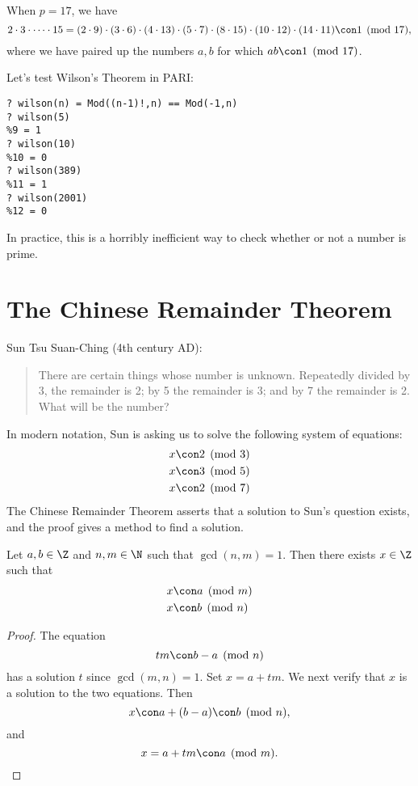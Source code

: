 \documentclass[11pt]{report}
\begin{document}
\begin{example}
  When $p=17$, we have
  $$
    2\cdot 3\cdot \cdots \cdot 15
    = (2\cdot 9)\cdot(3\cdot 6)\cdot(4\cdot 13)\cdot
    (5\cdot 7)\cdot(8\cdot 15)\cdot(10\cdot 12)\cdot(14\cdot 11)
    \con 1\pmod{17},$$
  where we have paired up the numbers $a, b$ for
  which $ab\con 1\pmod{17}$.
\end{example}

Let's test Wilson's Theorem in PARI:
\begin{verbatim}
? wilson(n) = Mod((n-1)!,n) == Mod(-1,n)   
? wilson(5)
%9 = 1
? wilson(10)
%10 = 0
? wilson(389)
%11 = 1
? wilson(2001)
%12 = 0
\end{verbatim}

 In practice, this is a horribly inefficient way to check
whether or not a number is prime.

\section{The Chinese Remainder Theorem}
Sun Tsu Suan-Ching (4th century AD):
\begin{quote}
  There are certain things whose number is unknown. Repeatedly divided
  by 3, the remainder is 2; by 5 the remainder is 3; and by 7 the
  remainder is 2. What will be the number?
\end{quote}
In modern notation, Sun is asking us to solve the following system of
equations:
\begin{align*}
  x & \con 2 \pmod{3} \\
  x & \con 3 \pmod{5} \\
  x & \con 2 \pmod{7}
\end{align*}
The Chinese Remainder Theorem asserts that a solution to Sun's
question exists, and the proof gives a method to find a solution.

\begin{theorem}
  Let $a, b\in\Z$ and $n,m\in\N$ such that
  $\gcd(n,m)=1$.  Then there exists $x\in\Z$ such that
  \begin{align*}
    x & \con a\pmod{m} \\
    x & \con b\pmod{n}
  \end{align*}
\end{theorem}
\begin{proof}
  The equation
  $$
    tm \con b-a\pmod{n}
  $$
  has a solution $t$ since $\gcd(m,n)=1$.
  Set $x=a+tm$.  We next verify that $x$ is a solution to the two equations.
  Then
  $$
    x \con a + (b-a) \con b \pmod{n},
  $$
  and
  $$
    x = a+tm \con a\pmod{m}.
  $$
\end{proof}
\end{document}
